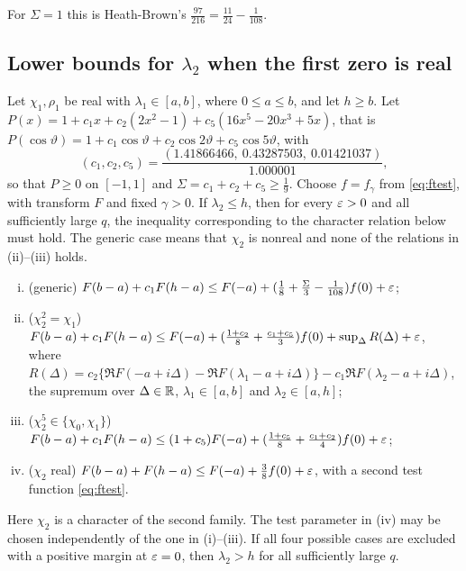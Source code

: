 For $\Sigma=1$ this is Heath-Brown's $\frac{97}{216}=\frac{11}{24}-\frac1{108}$.

\subsection{Lower bounds for \texorpdfstring{$\lambda_2$}{lambda2} when the first zero is real}

\begin{proposition}\label{prop:realrows}
Let $\chi_1,\rho_1$ be real with $\lambda_1\in[a,b]$, where $0\le a\le b$, and let $h\ge b$. Let
$P(x)=1+c_1x+c_2(2x^2-1)+c_5(16x^5-20x^3+5x)$, that is
$P(\cos\vartheta)=1+c_1\cos\vartheta+c_2\cos2\vartheta+c_5\cos5\vartheta$, with
\[
  (c_1,c_2,c_5)=\frac{(1.41866466,\ 0.43287503,\ 0.01421037)}{1.000001},
\]
so that $P\ge0$ on $[-1,1]$ and $\Sigma=c_1+c_2+c_5\ge\frac19$.
Choose $f=f_\gamma$ from \eqref{eq:ftest}, with transform $F$ and fixed $\gamma>0$.
If $\lambda_2\le h$, then for every $\varepsilon>0$ and all sufficiently large $q$, the inequality
corresponding to the character relation below must hold. The generic case means that
$\chi_2$ is nonreal and none of the relations in (ii)--(iii) holds.
\begin{enumerate}[(i)]
  \item (generic) $F(b-a)+c_1F(h-a)\le F(-a)+(\frac18+\frac\Sigma3-\frac1{108})f(0)+\varepsilon$;
  \item ($\chi_2^2=\chi_1$) $F(b-a)+c_1F(h-a)\le F(-a)+(\frac{1+c_2}8+\frac{c_1+c_5}3)f(0)+\sup_\Delta R(\Delta)+\varepsilon$,
    where $R(\Delta)=c_2\{\Re F(-a+i\Delta)-\Re F(\lambda_1-a+i\Delta)\}-c_1\Re F(\lambda_2-a+i\Delta)$, the supremum
    over $\Delta\in\mathbb{R}$, $\lambda_1\in[a,b]$ and $\lambda_2\in[a,h]$;
  \item ($\chi_2^5\in\{\chi_0,\chi_1\}$) $F(b-a)+c_1F(h-a)\le(1+c_5)F(-a)+(\frac{1+c_5}8+\frac{c_1+c_2}4)f(0)+\varepsilon$;
  \item ($\chi_2$ real) $F(b-a)+F(h-a)\le F(-a)+\frac38f(0)+\varepsilon$, with a second test function
    \eqref{eq:ftest}.
\end{enumerate}
Here $\chi_2$ is a character of the second family. The test parameter in (iv) may be
chosen independently of the one in (i)--(iii). If all four possible cases are excluded
with a positive margin at $\varepsilon=0$, then $\lambda_2>h$ for all sufficiently large $q$.
\end{proposition}


